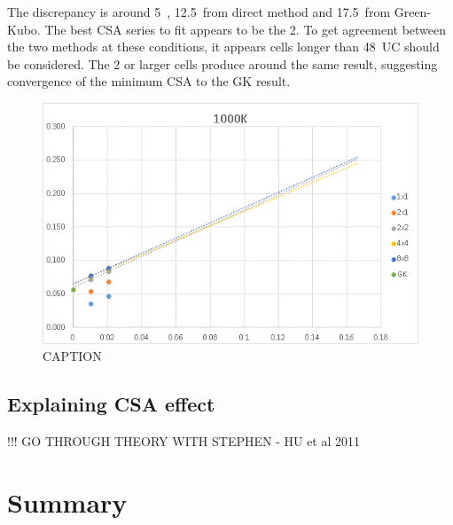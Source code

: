 \pagebreak

The discrepancy is around 5~\wmk, 12.5~\wmks from direct method and 17.5~\wmks from Green-Kubo. The best CSA series to fit appears to be the 2. To get agreement between the two methods at these conditions, it appears cells longer than 48~UC should be considered. The 2 or larger cells produce around the same result, suggesting convergence of the minimum CSA to the GK result.

\begin{figure}[h!]
\includegraphics[width=\linewidth]{Figures/direct_inv_cut-up_1000_01.png}
\caption[direct inv cutup 1000 01]{CAPTION}
\label{fig:direct_inv_cutup_1000_01}
\end{figure}

\pagebreak

\subsection{\label{sec:3.DM.theory}Explaining CSA effect}

!!! GO THROUGH THEORY WITH STEPHEN - HU et al 2011


 








\section{\label{sec:3.Summary}Summary}

